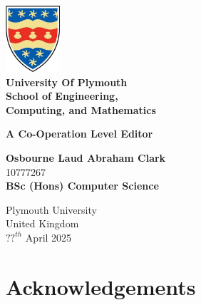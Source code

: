 \begin{titlepage}
  \begin{center}
    \includegraphics[width=0.15\textwidth]{./plymouthUniLogo2}\\
    \large
    \textbf{University Of Plymouth}\\
    \vspace{0.15cm}
    \large
    \textbf{School of Engineering,\\ Computing, and Mathematics}
    
    \vspace{1.9cm}
    \Huge
    \textbf{A Co-Operation Level Editor}
    
    \vspace{4.5cm}
    \Large
    \textbf{Osbourne Laud Abraham Clark}\\
    10777267\\
    \large
   \textbf{ BSc (Hons) Computer Science}
    
    \vspace{1.5cm}
      

    \large
    Plymouth University\\
    United Kingdom\\
    $??^{th}$ April 2025
    
    
    
  \end{center}
\end{titlepage}

\section*{Acknowledgements}

